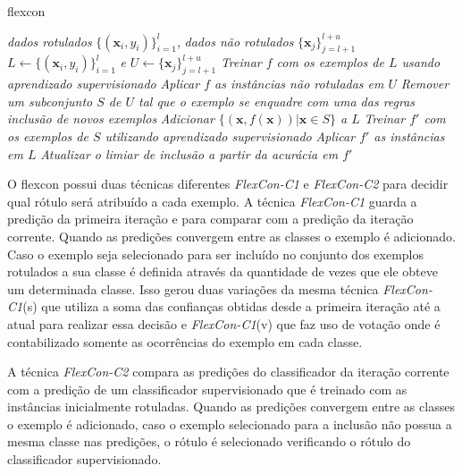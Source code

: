     \begin{algorithm}[H]
        \caption{\acs{flexcon}}
        \label{alg:flexcon-c}
        \SetAlgoLined
        \begin{algorithmic}[1]
            \REQUIRE \textit{dados rotulados} $\{(\mathbf{x}_i, y_i)\}^l_{i = 1}$, \textit{dados não rotulados} $\{\mathbf{x}_j\}^{l+u}_{j=l+1}$
            \ENSURE $L \leftarrow \{(\mathbf{x}_i, y_i)\}^l_{i = 1}$ \textit{e} $U \leftarrow \{\mathbf{x}_j\}^{l+u}_{j = l+1}$
            \REPEAT
            	\STATE \textit{Treinar $f$ com os exemplos de $L$ usando aprendizado supervisionado}
            	\STATE \textit{Aplicar $f$ as instâncias não rotuladas em $U$}
            	\STATE \textit{Remover um subconjunto $S$ de $U$ tal que o exemplo se enquadre com uma das regras inclusão de novos exemplos}
            	\STATE \textit{Adicionar $\{(\mathbf{x}, f(\mathbf{x}))|\mathbf{x} \in  S\}$ a $L$}
            	\STATE \textit{Treinar $f'$ com os exemplos de $S$ utilizando aprendizado supervisionado}
            	\STATE \textit{Aplicar $f'$ as instâncias em $L$}
            	\STATE \textit{Atualizar o limiar de inclusão a partir da acurácia em $f'$}
        \end{algorithmic}
    \end{algorithm}
	\begin{center}
        \vspace{-2em}
	\end{center}
    \vspace{-2em}
    O \ac{flexcon} possui duas técnicas diferentes \textit{FlexCon\hyp{C1}} e \textit{FlexCon\hyp{C2}} para decidir qual rótulo será atribuído a cada exemplo. A técnica \textit{FlexCon\hyp{C1}} guarda a predição da primeira iteração e para comparar com a predição da iteração corrente. Quando as predições convergem entre as classes o exemplo é adicionado. Caso o exemplo seja selecionado para ser incluído no conjunto dos exemplos rotulados a sua classe é definida através da quantidade de vezes que ele obteve um determinada classe. Isso gerou duas variações da mesma técnica \textit{FlexCon\hyp{C1}}(s) que utiliza a soma das confianças obtidas desde a primeira iteração até a atual para realizar essa decisão e \textit{FlexCon\hyp{C1}}(v) que faz uso de votação onde é contabilizado somente as ocorrências do exemplo em cada classe.

    A técnica \textit{FlexCon\hyp{C2}} compara as predições do classificador da iteração corrente com a predição de um classificador supervisionado que é treinado com as instâncias inicialmente rotuladas. Quando as predições convergem entre as classes o exemplo é adicionado, caso o exemplo selecionado para a inclusão não possua a mesma classe nas predições, o rótulo é selecionado verificando o rótulo do classificador supervisionado.

